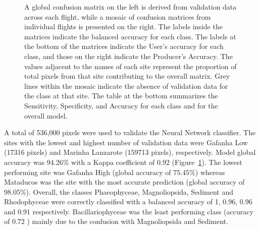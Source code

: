 \documentclass[
  number]{elsarticle}
\begin{document}
\label{cell-fig-Validation}
\begin{figure}[H]


\caption{\label{fig-Validation}A global confusion matrix on the left is
derived from validation data across each flight, while a mosaic of
confusion matrices from individual flights is presented on the right.
The labels inside the matrices indicate the balanced accuracy for each
class. The labels at the bottom of the matrices indicate the User's
accuracy for each class, and those on the right indicate the Producer's
Accuracy. The values adjacent to the names of each site represent the
proportion of total pixels from that site contributing to the overall
matrix. Grey lines within the mosaic indicate the absence of validation
data for the class at that site. The table at the bottom summarizes the
Sensitivity, Specificity, and Accuracy for each class and for the
overall model.}

\end{figure}%

A total of 536,000 pixels were used to validate the Neural Network
classifier. The sites with the lowest and highest number of validation
data were Gafanha Low (17316 pixels) and Marinha Lanzarote (159713
pixels), respectively. Model global accuracy was 94.26\% with a Kappa
coefficient of 0.92 (Figure~\ref{fig-Validation}). The lowest performing
site was Gafanha High (global accuracy of 75.45\%) whereas Mataducos was
the site with the most accurate prediction (global accuracy of 98.05\%).
Overall, the classes Phaeophyceae, Magnoliopsida, Sediment and
Rhodophyceae were correctly classified with a balanced accuracy of 1,
0.96, 0.96 and 0.91 respectively. Bacillariophyceae was the least
performing class (accuracy of 0.72 ) mainly due to the confusion with
Magnoliopsida and Sediment.
\end{document}
